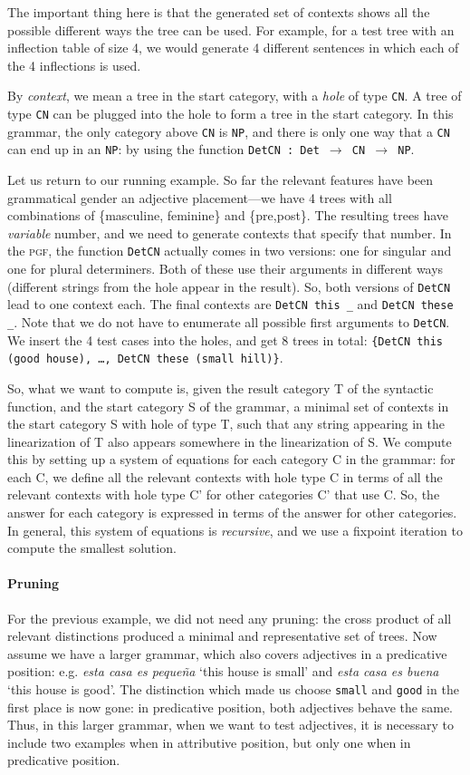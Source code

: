 \documentclass[11pt]{article}
\def\t#1{\texttt{#1}}
\def\pgf{\textsc{pgf}}
\begin{document}
The important thing here is that the generated set of contexts shows all the possible different ways the tree can be used. For example, for a test tree with an inflection table of size 4, we would generate 4 different sentences in which each of the 4 inflections is used.

By \emph{context}, we mean a tree in
the start category, with a \emph{hole} of type \t{CN}. A tree of type \t{CN} can be plugged into the hole to form a tree in the start category. In this grammar, the only category above \t{CN} is \t{NP}, and there is only
one way that a \t{CN} can end up in an \t{NP}: by using the function
\t{DetCN : Det $\rightarrow$ CN $\rightarrow$ NP}. 

Let us return to our running example. So far the relevant features have
been grammatical gender an adjective placement---we have 4 trees with
all combinations of \{masculine, feminine\} and \{pre,post\}. The
resulting trees have \emph{variable} number, and we need to generate contexts that specify that number. In the \pgf{}, the function \t{DetCN} actually comes in two versions: one for singular and one for plural determiners. Both of these use their arguments in different ways (different strings from the hole appear in the result). So, both versions of \t{DetCN} lead to one context each. The final contexts are \verb|DetCN this _| and  \verb|DetCN these _|. Note that we do not have to enumerate all possible first arguments to \t{DetCN}. We insert the 4 test
cases into the holes, and get 8 trees in total: \t{\{DetCN this (good
  house), \dots, DetCN these (small hill)\}}. 

So, what we want to compute is, given the result category T of the syntactic function, and the start category S of the grammar, a minimal set of contexts in the start category S with hole of type T, such that any string appearing in the linearization of T also appears somewhere in the linearization of S. We compute this by setting up a system of equations for each category C in the grammar: for each C, we define all the relevant contexts with hole type C in terms of all the relevant contexts with hole type C' for other categories C' that use C. So, the answer for each category is expressed in terms of the answer for other categories. In general, this system of equations is \emph{recursive}, and we use a fixpoint iteration to compute the smallest solution.

\paragraph{Pruning} For the previous example, we did not need any pruning: the cross
product of all relevant distinctions produced a minimal and
representative set of trees. Now assume we have a larger grammar,
which also covers adjectives in a predicative position:
e.g. \emph{esta casa es peque\~{n}a} `this house is small' and
\emph{esta casa es buena} `this house is good'. The distinction which
made us choose \t{small} and \t{good} in the first place is now gone:
in predicative position, both adjectives behave the same. Thus, in
this larger grammar, when we want to test adjectives, it is necessary
to include two examples when in attributive position, but only one
when in predicative position. 
\end{document}
